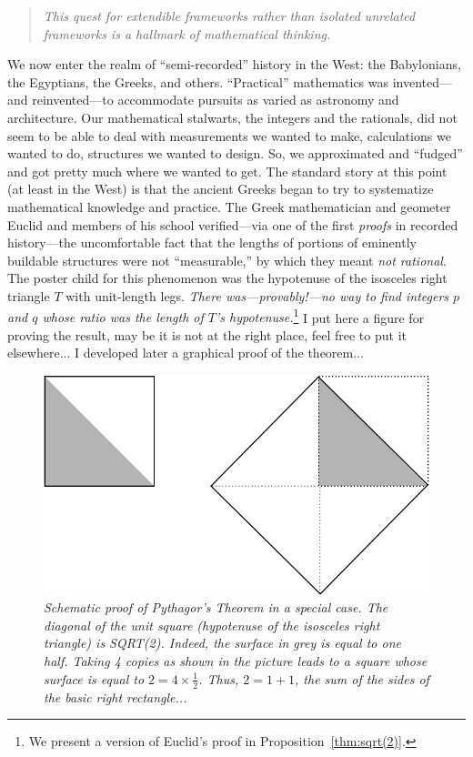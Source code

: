 \begin{quote}
{\em This quest for {\em extendible} frameworks rather than isolated
  unrelated frameworks is a hallmark of mathematical thinking.}
\end{quote}
We now enter the realm of ``semi-recorded'' history in the West: the
Babylonians, the Egyptians, the Greeks, and others.  ``Practical''
mathematics was invented---and reinvented---to accommodate pursuits as
varied as astronomy and architecture.  Our mathematical stalwarts, the
integers and the rationals, did not seem to be able to deal with
measurements we wanted to make, calculations we wanted to do,
structures we wanted to design.  So, we approximated and ``fudged''
and got pretty much where we wanted to get.  The standard story at this
point (at least in the West) is that the ancient Greeks began to try
to systematize mathematical knowledge and practice.  The Greek
mathematician and geometer Euclid
%
and members of his school verified---via one of the first {\em proofs}
in recorded history---the uncomfortable fact that the lengths of
portions of eminently buildable structures were not ``measurable,'' by
which they meant {\em not rational}.  The poster child for this
phenomenon was the hypotenuse of the isosceles right triangle $T$ with
unit-length legs.  {\em There was---provably!---no way to find
  integers $p$ and $q$ whose ratio was the length of $T$'s
  hypotenuse.}\footnote{We present a version of Euclid's proof in
  Proposition~\ref{thm:sqrt(2)}.}
{\Denis I put here a figure for proving the result, may be it is not at the right place, feel free to put it elsewhere...
I developed later a graphical proof of the theorem...}
\begin{figure}[htb]
\begin{center}
       \includegraphics[scale=0.35]{FiguresArithmetic/UnitSquareSQRT2}
\caption{{\it Schematic proof of Pythagor's Theorem in a special case.
The diagonal of the unit square (hypotenuse of the isosceles right triangle) is SQRT(2).
Indeed, the surface in grey is equal to one half. Taking 4 copies as shown in the picture leads to a square whose surface is equal to $2=4 \times \frac{1}{2}$.
Thus, $2 = 1 + 1$, the sum of the sides of the basic right rectangle...}
\label{fig:unitsquare}}
\end{center}
\end{figure}

